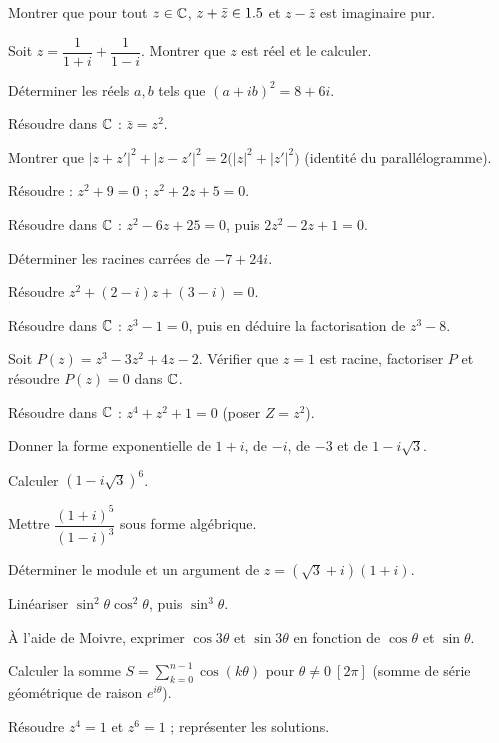 \exo{} Montrer que pour tout $z\in\mathbb{C}$, $z+\bar z\in1.5$ et $z-\bar z$ est imaginaire pur.

\exo{} Soit $z=\dfrac{1}{1+i}+\dfrac{1}{1-i}$. Montrer que $z$ est réel et le calculer.

\exo{} Déterminer les réels $a,b$ tels que $(a+ib)^{2}=8+6i$.

\exo{} Résoudre dans $\mathbb{C}$ : $\bar z=z^{2}$.

\exo{} Montrer que $|z+z'|^{2}+|z-z'|^{2}=2\big(|z|^{2}+|z'|^{2}\big)$ (identité du
parallélogramme).

\exo{} Résoudre : $z^{2}+9=0$ ; $z^{2}+2z+5=0$.

\exo{} Résoudre dans $\mathbb{C}$ : $z^{2}-6z+25=0$, puis $2z^{2}-2z+1=0$.

\exo{} Déterminer les racines carrées de $-7+24i$.

\exo{} Résoudre $z^{2}+(2-i)z+(3-i)=0$.

\exo{} Résoudre dans $\mathbb{C}$ : $z^{3}-1=0$, puis en déduire la factorisation de $z^{3}-8$.

\exo{} Soit $P(z)=z^{3}-3z^{2}+4z-2$. Vérifier que $z=1$ est racine, factoriser $P$ et
résoudre $P(z)=0$ dans $\mathbb{C}$.

\exo{} Résoudre dans $\mathbb{C}$ : $z^{4}+z^{2}+1=0$ (poser $Z=z^{2}$).

\exo{} Donner la forme exponentielle de $1+i$, de $-i$, de $-3$ et de $1-i\sqrt3$.

\exo{} Calculer $(1-i\sqrt3)^{6}$.

\exo{} Mettre $\dfrac{(1+i)^{5}}{(1-i)^{3}}$ sous forme algébrique.

\exo{} Déterminer le module et un argument de $z=(\sqrt3+i)(1+i)$.

\exo{} Linéariser $\sin^{2}\theta\cos^{2}\theta$, puis $\sin^{3}\theta$.

\exo{} À l'aide de Moivre, exprimer $\cos3\theta$ et $\sin3\theta$ en fonction de
$\cos\theta$ et $\sin\theta$.

\exo{} Calculer la somme $S=\sum_{k=0}^{n-1}\cos(k\theta)$ pour $\theta\neq0\ [2\pi]$ (somme
de série géométrique de raison $e^{i\theta}$).

\exo{} Résoudre $z^{4}=1$ et $z^{6}=1$ ; représenter les solutions.

